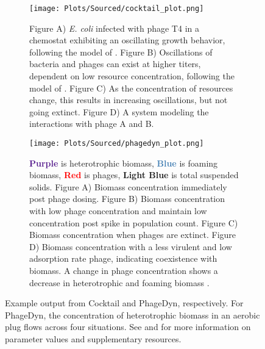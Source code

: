 \begin{figure}
    \centering
    \begin{subfigure}{0.49\linewidth}
        \centering
        \captionsetup{width=1\linewidth}
        \texttt{[image: Plots/Sourced/cocktail\_plot.png]}
        \caption{
            Figure A) \textit{E. coli} infected with phage T4 in a chemostat exhibiting an oscillating growth behavior, following the model of \citet{bohannanEffectResourceEnrichment1997}. 
            Figure B) Oscillations of bacteria and phages can exist at higher titers, dependent on low resource concentration, following the model of \citet{lenskiDynamicsInteractionsBacteria1988}. 
            Figure C) As the concentration of resources change, this results in increasing oscillations, but not going extinct. 
            Figure D) A system modeling the interactions with phage A and B. 
        }
        \label{fig:sourced:cocktail_plot}
    \end{subfigure}
    \hfill
    \begin{subfigure}{0.49\linewidth}
        \centering
        \captionsetup{width=1\linewidth}
        \texttt{[image: Plots/Sourced/phagedyn\_plot.png]}
        \caption{
            \textcolor[HTML]{551A8C}{\textbf{Purple}} is heterotrophic biomass, 
            \textcolor[HTML]{4580B4}{\textbf{Blue}} is foaming biomass, 
            \textcolor[HTML]{FF0000}{\textbf{Red}} is phages, 
            \textcolor[HTML]{01E6EE}{\textbf{Light Blue}} is total suspended solids. 
            Figure A) Biomass concentration immediately post phage dosing. 
            Figure B) Biomass concentration with low phage concentration and maintain low concentration post spike in population count. 
            Figure C) Biomass concentration when phages are extinct. 
            Figure D) Biomass concentration with a less virulent and low adsorption rate phage, indicating coexistence with biomass. 
            A change in phage concentration shows a decrease in heterotrophic and foaming biomass \cite{krysiak-baltynSimulationPhageDynamics2017}. 
        }
        \label{fig:sourced:phagedyn_plot}
    \end{subfigure}
    \caption{Example output from Cocktail and PhageDyn, respectively. For PhageDyn, the concentration of heterotrophic biomass in an aerobic plug flows across four situations.
        See \citet{nilssonCocktailComputerProgram2022} and \citet{krysiak-baltynSimulationPhageDynamics2017} for more information on parameter values and supplementary resources. 
    }
    \label{fig:sourced:cocktail_and_phagedyn}
\end{figure}

